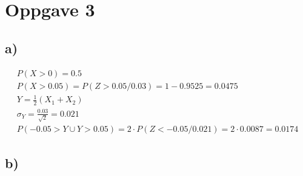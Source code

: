 \section*{Oppgave 3}

\subsection*{a)}

\begin{gather*}
	P(X > 0) = 0.5
	\\
	P(X > 0.05) = P(Z > 0.05 / 0.03) = 1 - 0.9525 = 0.0475
	\\
	Y = \frac{1}{2} (X_1 + X_2)
	\\
	\sigma_{Y} = \frac{0.03}{\sqrt{2}} = 0.021
	\\
	P(-0.05 > Y \cup Y > 0.05) = 2 \cdot P(Z < -0.05 / 0.021) = 2 \cdot 0.0087 = 0.0174
\end{gather*}


\subsection*{b)}

